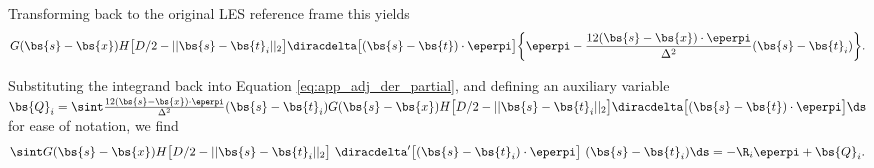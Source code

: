 \noindent Transforming back to the original LES reference frame this yields
{\small
\begin{align*}
G(\bs{s} - \bs{x})  H\big[D/2 - \vert\vert \bs{s} - \bs{t}_i \vert\vert_2 \big] \diracdelta\big[(\bs{s} - \bs{t})\cdot \eperpi \big] \bigg\{ \eperpi - \frac{12 (\bs{s} - \bs{x})\cdot \eperpi}{\Delta^2} (\bs{s} - \bs{t}_i) \bigg\}.
\end{align*}}

Substituting the integrand back into Equation \eqref{eq:app_adj_der_partial}, and defining an auxiliary variable $\bs{Q}_i = \sint \frac{12 (\bs{s} - \bs{x})\cdot \eperpi}{\Delta^2} (\bs{s} - \bs{t}_i) G(\bs{s} - \bs{x})  H\big[D/2 - \vert\vert \bs{s} - \bs{t}_i \vert\vert_2 \big] \diracdelta\big[(\bs{s} - \bs{t})\cdot \eperpi \big] \ds$ for ease of notation, we find
{\small 
\begin{align}
\sint G(\bs{s} - \bs{x})  H\big[D/2 - \vert\vert \bs{s} - \bs{t}_i \vert\vert_2 \big]~\diracdelta'\big[(\bs{s} - \bs{t}_i) \cdot \eperpi \big]~(\bs{s} - \bs{t}_i)  \ds 
=  - \R_i \eperpi + \bs{Q}_i. \label{eq:subs_this}
\end{align}}

